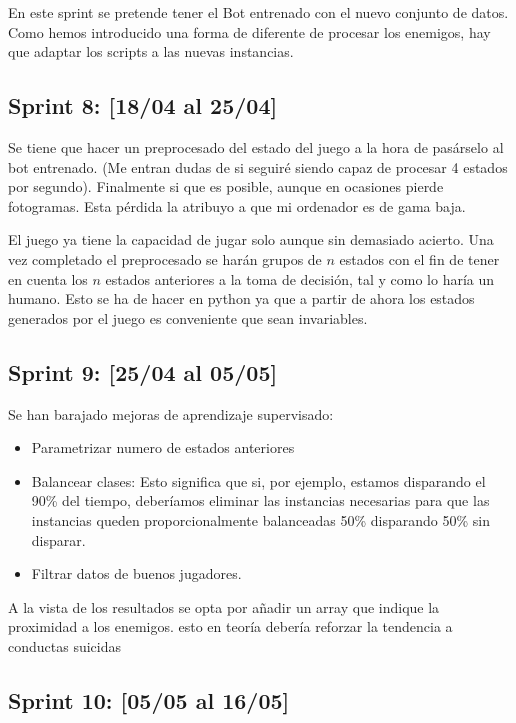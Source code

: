 En este sprint se pretende tener el Bot entrenado con el nuevo conjunto de datos. Como hemos introducido una forma de diferente de procesar los enemigos, hay que adaptar los scripts a las nuevas instancias.


\subsection{Sprint 8: [18/04 al 25/04]}

Se tiene que hacer un preprocesado del estado del juego a la hora de pasárselo al bot entrenado. (Me entran dudas de si seguiré siendo capaz de procesar 4 estados por segundo). Finalmente si que es posible, aunque en ocasiones pierde fotogramas. Esta pérdida la atribuyo a que mi ordenador es de gama baja.

El juego ya tiene la capacidad de jugar solo aunque sin demasiado acierto. Una vez completado el preprocesado se harán grupos de $n$ estados con el fin de tener en cuenta los $n$ estados anteriores a la toma de decisión, tal y como lo haría un humano. Esto se ha de hacer en python ya que a partir de ahora los estados generados por el juego es conveniente que sean invariables.

\subsection{Sprint 9: [25/04 al 05/05]}

Se han barajado mejoras de aprendizaje supervisado: 
\begin{itemize}
    \item Parametrizar numero de estados anteriores
    \item Balancear clases: Esto significa que si, por ejemplo, estamos disparando el 90\% del tiempo, deberíamos eliminar las instancias necesarias para que las instancias queden proporcionalmente balanceadas 50\% disparando 50\% sin disparar. 
    \item Filtrar datos de buenos jugadores.
\end{itemize}
  
  A la vista de los resultados se opta por añadir un array que indique la proximidad a los enemigos. esto en teoría debería reforzar la tendencia a conductas suicidas
  

\subsection{Sprint 10: [05/05 al 16/05]}

